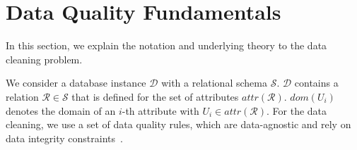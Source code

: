 \section{Data Quality Fundamentals}
\label{sec:expl}



In this section, we explain the notation and underlying theory to the data cleaning problem. 

We consider a database instance $\mathcal{D}$ with a relational schema $\mathcal{S}$. $\mathcal{D}$ contains a relation $\mathcal{R} \in \mathcal{S}$ that is defined for the set of attributes $attr(\mathcal{R})$. $dom(U_i)$ denotes the domain of an $i$-th attribute with $U_i \in attr(\mathcal{R})$. For the data cleaning, we use a set of data quality rules, which are data-agnostic and rely on data integrity constraints~\cite{AbiteboulHV95}.

